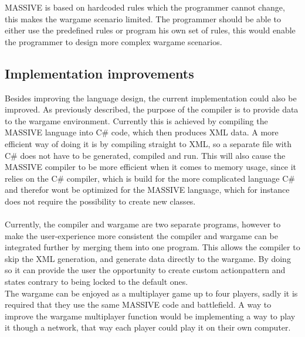 MASSIVE is based on hardcoded rules which the programmer cannot change, this makes the wargame scenario limited. The programmer should be able to either use the predefined rules or program his own set of rules, this would enable the programmer to design more complex wargame scenarios.
\begin{comment}
@@@
To make the language more of a simulation and less of a game, it could also be implemented that the actionpatterns are not limited to the encounter and move functionality. These functionalities could be expanded by adding more states to the action interpreter. \\
A feature which enables the programmer to compare the current unit with units in its vicinity and act accordingly could also be implemented, this would give the agents a more independent and life-like behavior.
@@@
\end{comment}\subsection{Implementation improvements}
Besides improving the language design, the current implementation could also be improved. As previously described, the purpose of the compiler is to provide data to the wargame environment.
Currently this is achieved by compiling the MASSIVE language into C\# code, which then produces XML data. 
A more efficient way of doing it is by compiling straight to XML, so a separate file with C\# does not have to be generated, compiled and run. 
This will also cause the MASSIVE compiler to be more efficient when it comes to memory usage, since it relies on the C\# compiler, which is build for the more complicated language C\# and therefor wont be optimized for the MASSIVE language, which for instance does not require the possibility to create new classes.\\
 \\
Currently, the compiler and wargame are two separate programs, however to make the user-experience more consistent the compiler and wargame can be integrated further by merging them into one program.
This allows the compiler to skip the XML generation, and generate data directly to the wargame. By doing so it can provide the user the opportunity to create custom actionpattern and states contrary to being locked to the default ones.\newline
 \\
The wargame can be enjoyed as a multiplayer game up to four players, sadly it is required that they use the same MASSIVE code and battlefield. A way to improve the wargame multiplayer function would be implementing a way to play it though a network, that way each player could play it on their own computer.

